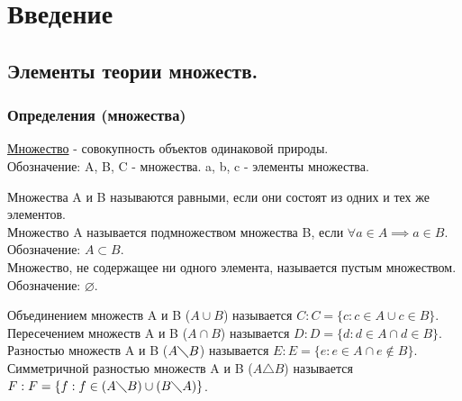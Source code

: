 \documentclass[12pt]{article}
\begin{document}
    \justifying
    \tableofcontents
    \pagebreak
    \section{Введение}
    \subsection{Элементы теории множеств.}
    \subsubsection*{Определения (множества)}
    \noindent \underline{Множество} - совокупность объектов одинаковой природы.\\
    Обозначение: A, B, C - множества. a, b, c - элементы множества.\par
    \noindent Множества A и B называются равными, если они состоят из одних и тех же элементов.\\
    Множество A называется подмножеством множества B, если $\forall a \in A \implies a \in B$. Обозначение: $A \subset B$.\\
    Множество, не содержащее ни одного элемента, называется пустым множеством. Обозначение: $\varnothing$.\par
    \noindent Объединением множеств A и B ($A \cup B$) называется $C : C = \{ c : c \in A \cup c \in B \}$.\\
    Пересечением множеств A и B ($A \cap B$) называется $D : D = \{ d : d \in A \cap d \in B \}$.\\
    Разностью множеств A и B ($A \diagdown B$) называется $E : E = \{ e : e \in A \cap e \notin B \}$.\\
    Симметричной разностью множеств A и B ($A \triangle B$) называется $F : F = \{ f : f \in (A \diagdown B) \cup (B \diagdown A)\}$.
    \par
\end{document}
